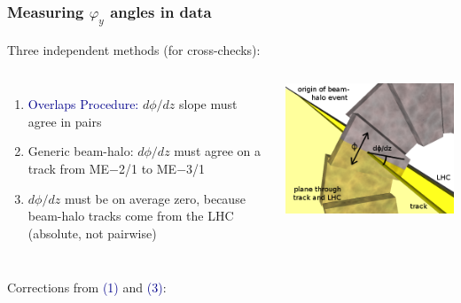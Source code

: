 \documentclass[compress]{beamer}
\begin{document}

\begin{frame}
\frametitle{Measuring $\varphi_y$ angles in data}
\small

Three independent methods (for cross-checks):
\begin{columns}

\begin{enumerate}
\item \textcolor{darkblue}{Overlaps Procedure:} $d\phi/dz$ slope must agree in pairs
\item Generic beam-halo: $d\phi/dz$ must agree on a track from ME$-$2/1 to ME$-$3/1
\item $d\phi/dz$ must be on average zero, because beam-halo tracks come from the LHC (absolute, not pairwise)
\end{enumerate}

\includegraphics[width=\linewidth]{track_lhc_plane_closeup.png}
\end{columns}

\vspace{-0.2 cm}
\begin{columns}
\begin{center}
Corrections from \textcolor{darkblue}{(1)} and \textcolor{darkblue}{(3)}:


\end{center}
\end{columns}
\end{frame}
\end{document}

